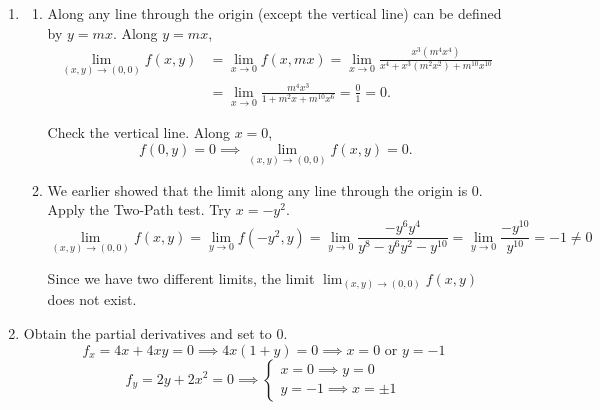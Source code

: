 \documentclass[a4paper, 12pt]{article}
\begin{document}
\begin{enumerate}[leftmargin=*,label=\textbf{\arabic*.}]
\begin{enumerate}[leftmargin=*,label=\textbf{\alph*.}]
Set the directional derivatives to $0$.
\[D_{\vec w}f=0\implies \nabla f\cdot \vec w=0\implies\left\langle2xy,x^2\right\rangle\cdot\left\langle\frac1{\sqrt2},\frac1{\sqrt2}\right\rangle=0\implies2xy+x^2=0\]
\[D_{\vec w}g=0\implies \nabla g\cdot \vec w=0\implies\left\langle3x^2,10y\right\rangle\cdot\left\langle\frac1{\sqrt2},\frac1{\sqrt2}\right\rangle=0\implies3x^2+10y=0\]

Factor $x$ in the first equation.
\[x(2y+x)=0\implies x=0\text{ or }x=-2y\]

Consider the second equation with the relations found above.
\[3x^2+10y=0\implies\left\{\begin{array}{l}x=0\implies y=0\\x=-2y\implies y(12y+10)=1\implies y=0\text{ or }y=-\frac{10}{12}\end{array}\right.\]

All the points are $\boxed{(x,y)=(0,0)\text{ and }(x,y)=\left(\frac53,-\frac{5}{6}\right)}$.

\end{enumerate}

\item \begin{enumerate}[leftmargin=*,label=\textbf{\alph*.}]
\item Along any line through the origin (except the vertical line) can be defined by $y=mx$. Along $y=mx$,
\begin{align*}\lim_{(x,y)\to(0,0)}f(x,y)&=\lim_{x\to0}f(x,mx)=\lim_{x\to0}\frac{x^3(m^4x^4)}{x^4+x^3(m^2x^2)+m^{10}x^{10}}\\[1em]&=\lim_{x\to0}\frac{m^4x^3}{1+m^2x+m^{10}x^6}=\frac01=\boxed0.\end{align*}

Check the vertical line. Along $x=0$,
\[f(0,y)=0\implies\lim_{(x,y)\to(0,0)}f(x,y)=\boxed0.\]

\item We earlier showed that the limit along any line through the origin is $0$. Apply the Two-Path test. Try $x=-y^2$.
\[\lim_{(x,y)\to(0,0)}f(x,y)=\lim_{y\to0}f\left(-y^2,y\right)=\lim_{y\to0}\frac{-y^6y^4}{y^8-y^6y^2-y^{10}}=\lim_{y\to0}\frac{-y^{10}}{y^{10}}=-1\neq0\]

Since we have two different limits, the limit $\displaystyle\lim_{(x,y)\to(0,0)}f(x,y)$ does not exist.

\end{enumerate}

\item Obtain the partial derivatives and set to $0$.
\[f_x=4x+4xy=0\implies 4x(1+y)=0\implies x=0 \text{ or } y=-1\]
\[f_y=2y+2x^2=0\implies\left\{\begin{array}{l}x=0\implies y=0\\ y=-1\implies x=\pm 1\end{array}\right.\]


\end{enumerate}
\end{document}

